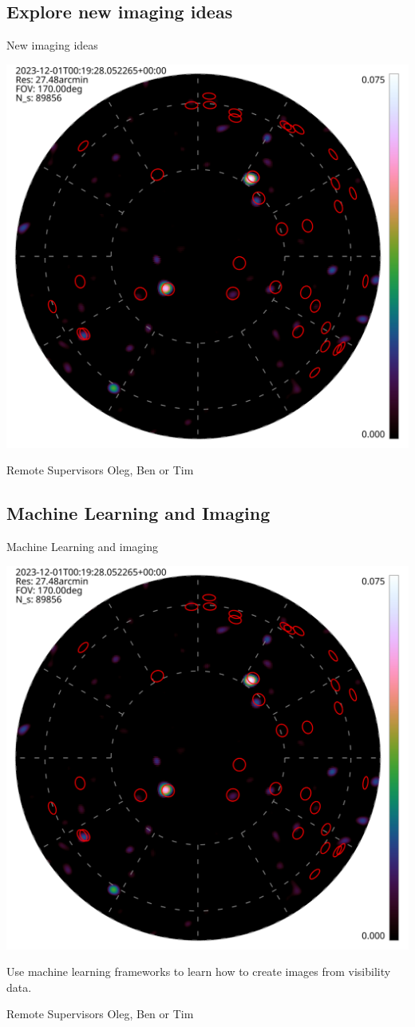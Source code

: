\documentclass[ignorenonframetext]{beamer}
\begin{document}
\subsection{Explore new imaging ideas}
\begin{frame}{New imaging ideas}
\begin{center}
\includegraphics[width=0.7\linewidth]{../tart_imaging/images/obs_00000.hdf.png}
 \end{center}
  \begin{block}{Remote Supervisors}
 Oleg, Ben or Tim
 \end{block}
\end{frame}



\subsection{Machine Learning and Imaging}
\begin{frame}{Machine Learning and imaging}
\begin{center}
\includegraphics[width=0.5\linewidth]{../tart_imaging/images/obs_00000.hdf.png}
 \end{center}
 Use machine learning frameworks to learn how to create images from visibility data.

 \begin{block}{Remote Supervisors}
 Oleg, Ben or Tim
 \end{block}
\end{frame}
\end{document}

